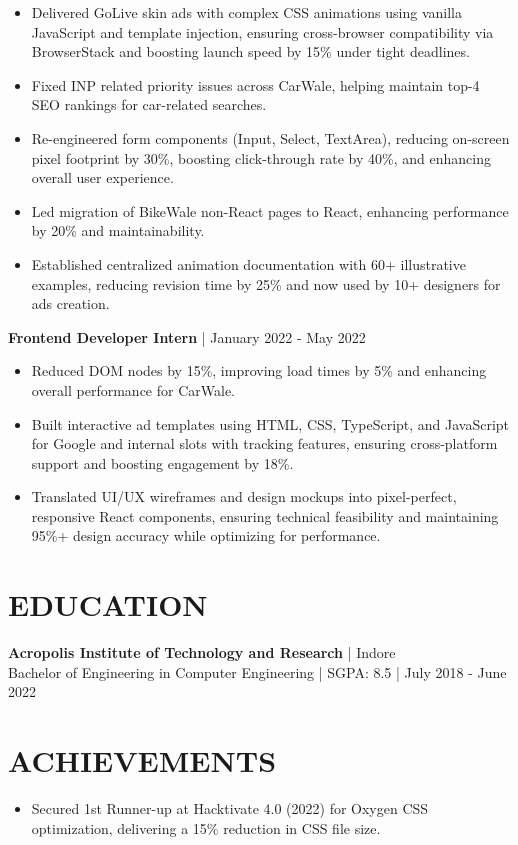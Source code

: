 \documentclass[letterpaper,10.5pt]{article}
\begin{document}
\begin{itemize}[leftmargin=0.15in, itemsep=-1pt]
    \item Delivered GoLive skin ads with complex CSS animations using vanilla JavaScript and template injection, ensuring cross-browser compatibility via BrowserStack and boosting launch speed by 15\% under tight deadlines.
    \item Fixed INP related priority issues across CarWale, helping maintain top-4 SEO rankings for car-related searches.
    \item Re-engineered form components (Input, Select, TextArea), reducing on-screen pixel footprint by 30\%, boosting click-through rate by 40\%, and enhancing overall user experience.
    \item Led migration of BikeWale non-React pages to React, enhancing performance by 20\% and maintainability.
    \item Established centralized animation documentation with 60+ illustrative examples, reducing revision time by 25\% and now used by 10+ designers for ads creation.
\end{itemize}

\vspace{2pt}

\textbf{Frontend Developer Intern} | January 2022 - May 2022

\begin{itemize}[leftmargin=0.15in, itemsep=-1pt]
    \item Reduced DOM nodes by 15\%, improving load times by 5\% and enhancing overall performance for CarWale.
    \item Built interactive ad templates using HTML, CSS, TypeScript, and JavaScript for Google and internal slots with tracking features, ensuring cross-platform support and boosting engagement by 18\%.
    \item Translated UI/UX wireframes and design mockups into pixel-perfect, responsive React components, ensuring technical feasibility and maintaining 95\%+ design accuracy while optimizing for performance.
\end{itemize}

\vspace{-2pt}

\section*{EDUCATION}

\textbf{Acropolis Institute of Technology and Research} | Indore\\
Bachelor of Engineering in Computer Engineering | SGPA: 8.5 | July 2018 - June 2022

\vspace{-2pt}

\section*{ACHIEVEMENTS}

\begin{itemize}[leftmargin=0.15in, itemsep=-1pt]
    \item Secured 1st Runner-up at Hacktivate 4.0 (2022) for Oxygen CSS optimization, delivering a 15\% reduction in CSS file size.
\end{itemize}
\end{document}
